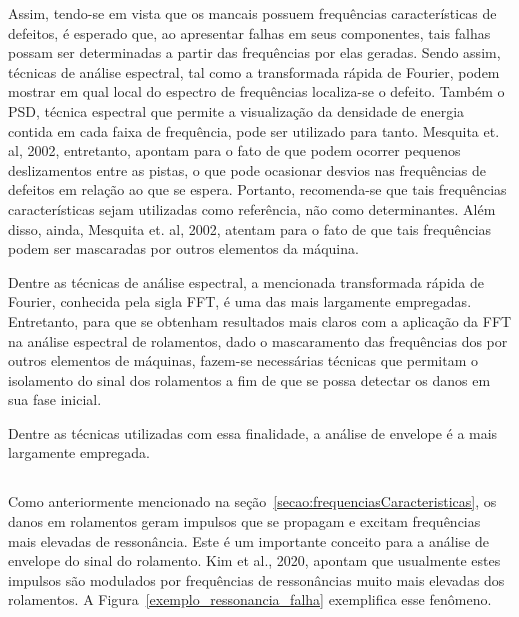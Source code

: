 \documentclass[
	12pt,				
	oneside,			
	a4paper,			
	english,			
	brazil,	
	sumario=abnt-6027-2012		
	]{abntex2ppgsi}
\begin{document}
Assim, tendo-se em vista que os mancais possuem frequências características de defeitos, é esperado que, ao apresentar falhas em seus componentes, tais falhas possam ser determinadas a partir das frequências por elas geradas. Sendo assim, técnicas de análise espectral, tal como a transformada rápida de Fourier, podem mostrar em qual local do espectro de frequências localiza-se o defeito. Também o PSD, técnica espectral que permite a visualização da densidade de energia contida em cada faixa de frequência, pode ser utilizado para tanto. Mesquita et. al, 2002, entretanto, apontam para o fato de que podem ocorrer pequenos deslizamentos entre as pistas, o que pode ocasionar desvios nas frequências de defeitos em relação ao que se espera. Portanto, recomenda-se que tais frequências características sejam utilizadas como referência, não como determinantes. Além disso, ainda, Mesquita et. al, 2002, atentam para o fato de que tais frequências podem ser mascaradas por outros elementos da máquina.

Dentre as técnicas de análise espectral, a mencionada transformada rápida de Fourier, conhecida pela sigla FFT, é uma das mais largamente empregadas. Entretanto, para que se obtenham resultados mais claros com a aplicação da FFT na análise espectral de rolamentos, dado o mascaramento das frequências dos por outros elementos de máquinas, fazem-se necessárias técnicas que permitam o isolamento do sinal dos rolamentos a fim de que se possa detectar os danos em sua fase inicial. 

Dentre as técnicas utilizadas com essa finalidade, a análise de envelope é a mais largamente empregada. 

\subsection{}

Como anteriormente mencionado na seção~\ref{secao:frequenciasCaracteristicas}, os danos em rolamentos geram impulsos que se propagam e excitam frequências mais elevadas de ressonância. Este é um importante conceito para a análise de envelope do sinal do rolamento. Kim et al., 2020, apontam que usualmente estes impulsos são modulados por frequências de ressonâncias muito mais elevadas dos rolamentos. A Figura~\ref{exemplo_ressonancia_falha} exemplifica esse fenômeno.
\end{document}
